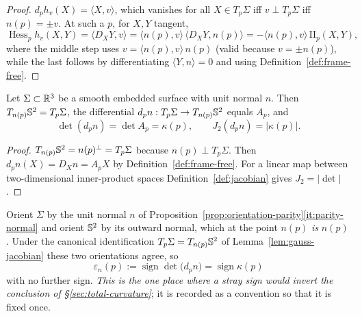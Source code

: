 \begin{proof}
$d_ph_v(X)=\langle X,v\rangle$, which vanishes for all $X\in T_p\Sigma$ iff
$v\perp T_p\Sigma$ iff $n(p)=\pm v$.  At such a $p$, for $X,Y$ tangent,
\[
  \operatorname{Hess}_ph_v(X,Y)=\langle D_XY,v\rangle
  =\langle n(p),v\rangle\,\langle D_XY,n(p)\rangle
  =-\langle n(p),v\rangle\,\mathrm{II}_p(X,Y),
\]
where the middle step uses $v=\langle n(p),v\rangle\,n(p)$ (valid because
$v=\pm n(p)$), while the last follows by differentiating
$\langle Y,n\rangle=0$ and using Definition~\ref{def:frame-free}.
\end{proof}

\begin{lemma}\label{lem:gauss-jacobian}
Let $\Sigma\subset\mathbb R^3$ be a smooth embedded surface with unit normal $n$.
Then $T_{n(p)}\mathbb S^2=T_p\Sigma$, the differential
$d_pn:T_p\Sigma\to T_{n(p)}\mathbb S^2$ equals $A_p$, and
\begin{equation}\label{eq:gauss-jacobian}
  \det(d_pn)=\det A_p=\kappa(p),
  \qquad
  J_2(d_pn)=|\kappa(p)| .
\end{equation}
\end{lemma}

\begin{proof}
$T_{n(p)}\mathbb S^2=n(p)^\perp=T_p\Sigma$ because $n(p)\perp T_p\Sigma$.  Then
$d_pn(X)=D_Xn=A_pX$ by Definition~\ref{def:frame-free}.  For a linear map
between two-dimensional inner-product spaces
Definition~\ref{def:jacobian} gives $J_2=|\det|$.
\end{proof}

\begin{convention}\label{conv:gauss-orientation}
Orient $\Sigma$ by the unit normal $n$ of
Proposition~\ref{prop:orientation-parity}\ref{it:parity-normal} and orient
$\mathbb S^2$ by its outward normal, which at the point $n(p)$ \emph{is} $n(p)$.
Under the canonical identification $T_p\Sigma=T_{n(p)}\mathbb S^2$ of
Lemma~\ref{lem:gauss-jacobian} these two orientations agree, so
\begin{equation}\label{eq:gauss-orientation}
  \varepsilon_n(p):=\operatorname{sign}\det\bigl(d_pn\bigr)
  =\operatorname{sign}\kappa(p)
\end{equation}
with no further sign.  \emph{This is the one place where a stray sign would
invert the conclusion of \S\ref{sec:total-curvature}}; it is recorded as a
convention so that it is fixed once.
\end{convention}

